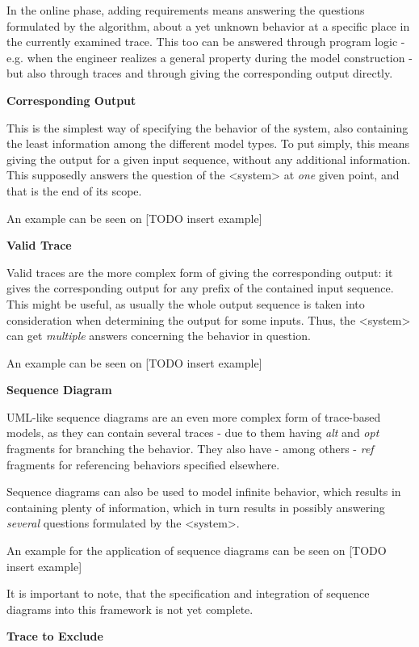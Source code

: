 In the online phase, adding requirements means answering the questions formulated by the algorithm, about a yet unknown behavior at a specific place in the currently examined trace. This too can be answered through program logic - e.g. when the engineer realizes a general property during the model construction - but also through traces and through giving the corresponding output directly.

\textbf{Corresponding Output}

This is the simplest way of specifying the behavior of the system, also containing the least information among the different model types. To put simply, this means giving the output for a given input sequence, without any additional information. This supposedly answers the question of the <system> at \textit{one} given point, and that is the end of its scope.

An example can be seen on [TODO insert example]

\textbf{Valid Trace}

Valid traces are the more complex form of giving the corresponding output: it gives the corresponding output for any prefix of the contained input sequence. This might be useful, as usually the whole output sequence is taken into consideration when determining the output for some inputs. Thus, the <system> can get \textit{multiple} answers concerning the behavior in question.

An example can be seen on [TODO insert example]

\textbf{Sequence Diagram}

UML-like sequence diagrams are an even more complex form of trace-based models, as they can contain several traces - due to them having \textit{alt} and \textit{opt} fragments for branching the behavior. They also have - among others - \textit{ref} fragments for referencing behaviors specified elsewhere.

Sequence diagrams can also be used to model infinite behavior, which results in containing plenty of information, which in turn results in possibly answering \textit{several} questions formulated by the <system>.

An example for the application of sequence diagrams can be seen on [TODO insert example]

It is important to note, that the specification and integration of sequence diagrams into this framework is not yet complete. 

\textbf{Trace to Exclude}

